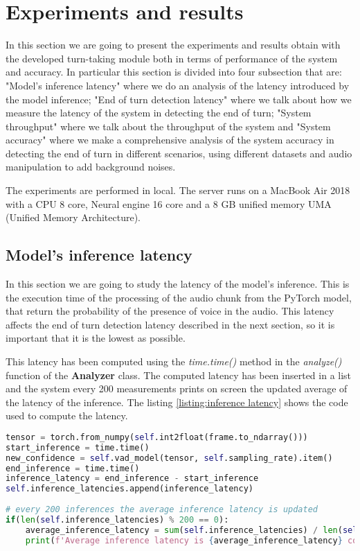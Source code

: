 \documentclass[../main.tex]{subfiles}
\begin{document}
\section{Experiments and results}

In this section we are going to present the experiments and results obtain with the developed turn-taking module both in terms of performance of the system and accuracy. In particular this section is divided into four subsection that are:  "Model's inference latency" where we do an analysis of the latency introduced by the model inference; "End of turn detection latency" where we talk about how we measure the latency of the system in detecting the end of turn; "System throughput" where we talk about the throughput of the system and "System accuracy" where we make a comprehensive analysis of the system accuracy in detecting the end of turn in different scenarios, using different datasets and audio manipulation to add background noises.

The experiments are performed in local. The server runs on a MacBook Air 2018 with a CPU 8 core, Neural engine 16 core and a 8 GB unified memory UMA (Unified Memory Architecture). 

\subsection{Model's inference latency}

In this section we are going to study the latency of the model's inference. This is the execution time of the processing of the audio chunk from the PyTorch model, that return the probability of the presence of voice in the audio. This latency affects the end of turn detection latency described in the next section, so it is important that it is the lowest as possible. 

This latency has been computed using the \textit{time.time()} method in the \textit{analyze()} function of the \textbf{Analyzer} class. The computed latency has been inserted in a list and the system every 200 measurements prints on screen the updated average of the latency of the inference. The listing \ref{listing:inference latency} shows the code used to compute the latency.

\begin{lstlisting}[language=Python, caption={Model's inference latency}]
tensor = torch.from_numpy(self.int2float(frame.to_ndarray()))
start_inference = time.time()
new_confidence = self.vad_model(tensor, self.sampling_rate).item()
end_inference = time.time()
inference_latency = end_inference - start_inference
self.inference_latencies.append(inference_latency)
            
# every 200 inferences the average inference latency is updated
if(len(self.inference_latencies) % 200 == 0):
    average_inference_latency = sum(self.inference_latencies) / len(self.inference_latencies)
    print(f'Average inference latency is {average_inference_latency} computed over {len(self.inference_latencies)} measurements')
\end{lstlisting}
\label{listing:inference latency}
\end{document}
